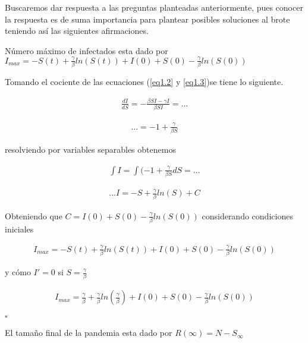 Buscaremos dar respuesta a las preguntas planteadas anteriormente, pues conocer la respuesta es de suma importancia para plantear posibles soluciones al brote teniendo así las siguientes afirmaciones.


\begin{Af}
Número máximo de infectados esta dado por $I_{max} = - S(t) + \frac{\gamma}{\beta} ln(S(t)) + I(0) + S(0) - \frac{\gamma}{\beta} ln(S(0))$
\end{Af}

\begin{Dem}

Tomando el cociente de las ecuaciones (\ref{eq1.2} y \ref{eq1.3})se tiene lo siguiente.

\begin{align*}
\frac{dI}{dS} = - \frac{\beta SI - \gamma I}{\beta SI} = ...
\end{align*}

\begin{align*}
... = -1 + \frac{\gamma}{\beta S}
\end{align*}

resolviendo por variables separables obtenemos

\begin{align*}
\int I = \int (-1 + \frac{\gamma}{\beta S} dS = ...
\end{align*}

\begin{align*}
... I = - S + \frac{\gamma}{\beta} ln(S) + C
\end{align*}

Obteniendo que  $C = I(0) + S(0)  - \frac{\gamma}{\beta} ln(S(0))$ considerando condiciones iniciales 

\begin{align*}
I_{max} = - S(t) + \frac{\gamma}{\beta} ln(S(t)) + I(0) + S(0) - \frac{\gamma}{\beta} ln(S(0))
\end{align*}

y cómo $I' = 0$  si  $S = \frac{\gamma}{\beta}$ 

\begin{align*}
I_{max} = \frac{\gamma}{\beta} + \frac{\gamma}{\beta} ln(\frac{\gamma}{\beta}) + I(0) + S(0) - \frac{\gamma}{\beta} ln(S(0))
\end{align*}


\end{Dem}

\hfill	$\square$

\begin{Af}
El tamaño final de la pandemia esta dado por $R(\infty) = N - S_{\infty}$
\end{Af}

